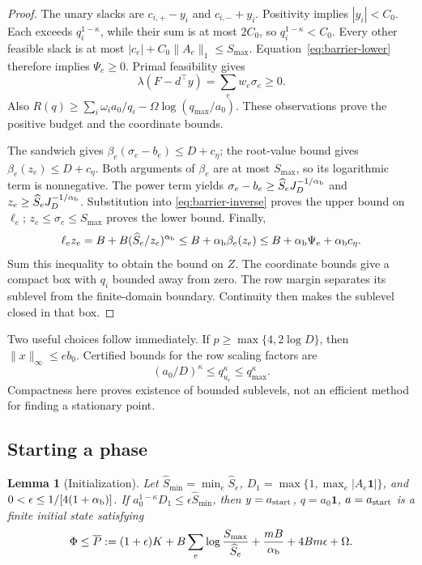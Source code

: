 \documentclass[11pt]{article}
\newtheorem{lemma}[theorem]{Lemma}
\theoremstyle{definition}\newtheorem{definition}[theorem]{Definition}
\theoremstyle{remark}\newtheorem{remark}[theorem]{Remark}
\newcommand{\one}{\mathbf1}
\begin{document}
\begin{proof}
The unary slacks are $c_{i,+}-y_i$ and $c_{i,-}+y_i$.  Positivity
implies $|y_i|<C_0$.  Each exceeds $q_i^{1-\kappa}$, while their sum
is at most $2C_0$, so $q_i^{1-\kappa}<C_0$.  Every other feasible
slack is at most $|c_e|+C_0\|A_e\|_1\le S_{\max}$.
Equation~\eqref{eq:barrier-lower} therefore implies $\Psi_e\ge0$.
Primal feasibility gives
\[
 \lambda(F-d^\top y)=\sum_e w_e\sigma_e\ge0.
\]
Also $R(q)\ge\sum_i\omega_i a_0/q_i-
\Omega\log(q_{\max}/a_0)$.  These observations prove the positive
budget and the coordinate bounds.

The sandwich gives $\beta_e(\sigma_e-b_e)\le D+c_\eta$;
the root-value bound gives $\beta_e(z_e)\le D+c_\eta$.
Both arguments of $\beta_e$ are at most $S_{\max}$, so its logarithmic
term is nonnegative.  The power term yields
$\sigma_e-b_e\ge\widehat S_eJ_D^{-1/\alpha_{\rm b}}$ and
$z_e\ge\widehat S_eJ_D^{-1/\alpha_{\rm b}}$.
Substitution into \eqref{eq:barrier-inverse} proves the upper bound
on $\ell_e$; $z_e\le\sigma_e\le S_{\max}$ proves the lower bound.
Finally,
\[
 \ell_ez_e=B+B(\widehat S_e/z_e)^{\alpha_{\rm b}}
 \le B+\alpha_{\rm b}\beta_e(z_e)
 \le B+\alpha_{\rm b}\Psi_e+\alpha_{\rm b}c_\eta.
\]
Sum this inequality to obtain the bound on $Z$.
The coordinate bounds give a compact box with $q_i$ bounded away from
zero.  The row margin separates its sublevel from the finite-domain
boundary.  Continuity then makes the sublevel closed in that box.
\end{proof}

Two useful choices follow immediately.  If
$p\ge\max\{4,2\log D\}$, then $\|x\|_\infty\le e b_0$.
Certified bounds for the row scaling factors are
\[
 (a_0/D)^\kappa\le q_{u_e}^{\kappa}\le q_{\max}^{\kappa}.
\]
Compactness here proves existence of bounded sublevels, not an efficient
method for finding a stationary point.

\subsection{Starting a phase}
\label{sec:range-initialization}

\begin{lemma}[Initialization]
\label{lem:range-initialization}
Let $\widehat S_{\min}=\min_e\widehat S_e$,
$D_1=\max\{1,\max_e|A_e\one|\}$, and
$0<\epsilon\le1/[4(1+\alpha_{\rm b})]$.
If $a_0^{1-\kappa}D_1\le\epsilon\widehat S_{\min}$, then
$y=a_{\rm start}$, $q=a_0\one$, $a=a_{\rm start}$ is a finite
initial state satisfying
\[
 \Phi\le\overline P:=(1+\epsilon)K
   +B\sum_e\log\frac{S_{\max}}{\widehat S_e}
   +\frac{mB}{\alpha_{\rm b}}+4Bm\epsilon+\Omega.
\]
\end{lemma}
\end{document}
